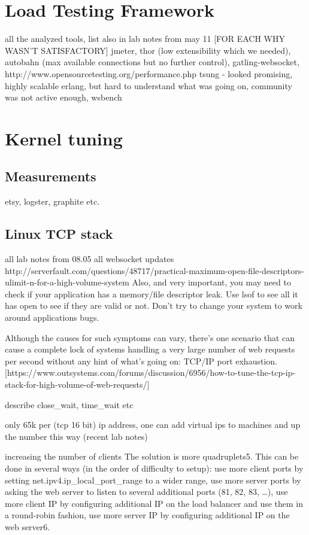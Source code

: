 \documentclass{uvamscse}
\begin{document}
\section{Load Testing Framework}\label{Load Testing Framework}
all the analyzed tools, list also in lab notes from may 11 [FOR EACH WHY WASN'T SATISFACTORY]
jmeter, thor (low extensibility which we needed), autobahn (max available connections but no further control),
gatling-websocket, http://www.opensourcetesting.org/performance.php
tsung - looked promising, highly scalable erlang, but hard to understand what was going on, community was not active enough, wsbench

\section{Kernel tuning}\label{Kernel tuning}

\subsection{Measurements}
etsy, logster, graphite etc.

\subsection{Linux TCP stack}
all lab notes from 08.05
all websocket updates
http://serverfault.com/questions/48717/practical-maximum-open-file-descriptors-ulimit-n-for-a-high-volume-system
Also, and very important, you may need to check if your application has a memory/file descriptor leak. Use lsof to see all it has open to see if they are valid or not. Don't try to change your system to work around applications bugs.

Although the causes for such symptoms can vary, there's one scenario that can cause a complete lock of systems handling a very large number of web requests per second without any hint of what's going on: TCP/IP port exhaustion. [https://www.outsystems.com/forums/discussion/6956/how-to-tune-the-tcp-ip-stack-for-high-volume-of-web-requests/]

describe close\_wait, time\_wait etc

only 65k per (tcp 16 bit) ip address, one can add virtual ips to machines and up the number this way
(recent lab notes)

increasing the number of clients
The solution is more quadruplets5. This can be done in several ways (in the order of difficulty to setup):
use more client ports by setting net.ipv4.ip\_local\_port\_range to a wider range,
use more server ports by asking the web server to listen to several additional ports (81, 82, 83, …),
use more client IP by configuring additional IP on the load balancer and use them in a round-robin fashion,
use more server IP by configuring additional IP on the web server6.
\end{document}
